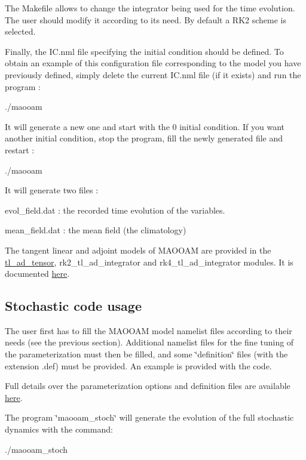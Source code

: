 The Makefile allows to change the integrator being used for the time evolution. The user should modify it according to its need. By default a R\+K2 scheme is selected.

Finally, the I\+C.\+nml file specifying the initial condition should be defined. To obtain an example of this configuration file corresponding to the model you have previously defined, simply delete the current I\+C.\+nml file (if it exists) and run the program \+: \begin{DoxyVerb}./maooam
\end{DoxyVerb}


It will generate a new one and start with the 0 initial condition. If you want another initial condition, stop the program, fill the newly generated file and restart \+: \begin{DoxyVerb}./maooam
\end{DoxyVerb}


It will generate two files \+:
\begin{DoxyItemize}
\item evol\+\_\+field.\+dat \+: the recorded time evolution of the variables.
\item mean\+\_\+field.\+dat \+: the mean field (the climatology)
\end{DoxyItemize}

The tangent linear and adjoint models of M\+A\+O\+O\+AM are provided in the \hyperlink{namespacetl__ad__tensor}{tl\+\_\+ad\+\_\+tensor}, rk2\+\_\+tl\+\_\+ad\+\_\+integrator and rk4\+\_\+tl\+\_\+ad\+\_\+integrator modules. It is documented \hyperlink{md_doc_tl_ad_doc}{here}. 



\subsection*{Stochastic code usage}

The user first has to fill the M\+A\+O\+O\+AM model namelist files according to their needs (see the previous section). Additional namelist files for the fine tuning of the parameterization must then be filled, and some \char`\"{}definition\char`\"{} files (with the extension .def) must be provided. An example is provided with the code.

Full details over the parameterization options and definition files are available \hyperlink{md_doc_sto_doc}{here}.

The program \char`\"{}maooam\+\_\+stoch\char`\"{} will generate the evolution of the full stochastic dynamics with the command\+: \begin{DoxyVerb}./maooam_stoch
\end{DoxyVerb}


